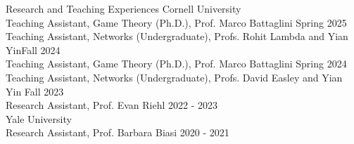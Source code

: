 \documentclass{resume} %
\begin{document}

\begin{rSection}{Research and Teaching Experiences}
Cornell University \\
\-\hspace{1em} Teaching Assistant, Game Theory (Ph.D.), Prof. Marco Battaglini \hfill Spring 2025 \\
\-\hspace{1em} Teaching Assistant, Networks (Undergraduate), Profs. Rohit Lambda and Yian Yin\hfill Fall 2024 \\
\-\hspace{1em} Teaching Assistant, Game Theory (Ph.D.), Prof. Marco Battaglini \hfill Spring 2024 \\
\-\hspace{1em} Teaching Assistant, Networks (Undergraduate), Profs. David Easley and Yian Yin \hfill Fall 2023 \\
\-\hspace{1em} Research Assistant, Prof. Evan Riehl \hfill 2022 - 2023 \\
Yale University \\
\-\hspace{1em} Research Assistant, Prof. Barbara Biasi \hfill 2020 - 2021
\end{rSection}







\end{document}
